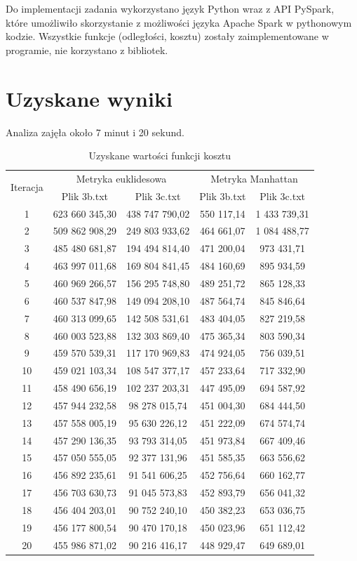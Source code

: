 \documentclass[a4paper,11pt]{article}
\begin{document}
Do implementacji zadania wykorzystano język Python wraz z API PySpark, które umożliwiło skorzystanie z możliwości języka Apache Spark w pythonowym kodzie. Wszystkie funkcje (odległości, kosztu) zostały zaimplementowane w programie, nie korzystano z bibliotek. 

\section{Uzyskane wyniki}

Analiza zajęła około 7 minut i 20 sekund.

\begin{table}[H]
\centering
\caption{Uzyskane wartości funkcji kosztu}
\label{tab:cost_results}
\begin{tabular}{@{}ccccc@{}}
\toprule
\multirow{2}{*}{Iteracja} & \multicolumn{2}{c}{Metryka euklidesowa} & \multicolumn{2}{c}{Metryka Manhattan} \\ \cmidrule(l){2-5} 
 & Plik 3b.txt & Plik 3c.txt & Plik 3b.txt & Plik 3c.txt \\ \midrule
1 & 623 660 345,30 & 438 747 790,02 & 550 117,14 & 1 433 739,31 \\
2 & 509 862 908,29 & 249 803 933,62 & 464 661,07 & 1 084 488,77 \\
3 & 485 480 681,87 & 194 494 814,40 & 471 200,04 & 973 431,71 \\
4 & 463 997 011,68 & 169 804 841,45 & 484 160,69 & 895 934,59 \\
5 & 460 969 266,57 & 156 295 748,80 & 489 251,72 & 865 128,33 \\
6 & 460 537 847,98 & 149 094 208,10 & 487 564,74 & 845 846,64 \\
7 & 460 313 099,65 & 142 508 531,61 & 483 404,05 & 827 219,58 \\
8 & 460 003 523,88 & 132 303 869,40 & 475 365,34 & 803 590,34 \\
9 & 459 570 539,31 & 117 170 969,83 & 474 924,05 & 756 039,51 \\
10 & 459 021 103,34 & 108 547 377,17 & 457 233,64 & 717 332,90 \\
11 & 458 490 656,19 & 102 237 203,31 & 447 495,09 & 694 587,92 \\
12 & 457 944 232,58 & 98 278 015,74 & 451 004,30 & 684 444,50 \\
13 & 457 558 005,19 & 95 630 226,12 & 451 222,09 & 674 574,74 \\
14 & 457 290 136,35 & 93 793 314,05 & 451 973,84 & 667 409,46 \\
15 & 457 050 555,05 & 92 377 131,96 & 451 585,35 & 663 556,62 \\
16 & 456 892 235,61 & 91 541 606,25 & 452 756,64 & 660 162,77 \\
17 & 456 703 630,73 & 91 045 573,83 & 452 893,79 & 656 041,32 \\
18 & 456 404 203,01 & 90 752 240,10 & 450 382,23 & 653 036,75 \\
19 & 456 177 800,54 & 90 470 170,18 & 450 023,96 & 651 112,42 \\
20 & 455 986 871,02 & 90 216 416,17 & 448 929,47 & 649 689,01 \\
\bottomrule
\end{tabular}
\end{table}
\end{document}
